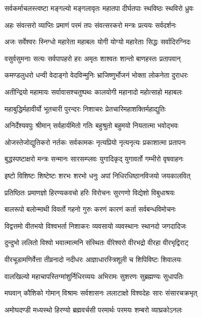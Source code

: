 \twolineshloka
{सर्वकर्माचलस्त्वष्टा मङ्गल्यो मङ्गलावृतः}
{महातपा दीर्घतपाः स्थविष्ठः स्थविरो ध्रुवः}

\twolineshloka
{अहः संवत्सरो व्याप्तिः प्रमाणं परमं तपः}
{संवत्सरकरो मन्त्रः प्रत्ययः सर्वदर्शनः}

\twolineshloka
{अजः सर्वेश्वरः स्निग्धो महारेता महाबलः}
{योगी योग्यो महारेताः सिद्धः सर्वादिरग्निदः}

\twolineshloka
{वसुर्वसुमनाः सत्यः सर्वपापहरो हरः}
{अमृतः शाश्वतः शान्तो बाणहस्तः प्रतापवान्}

\twolineshloka
{कमण्डलुधरो धन्वी वेदाङ्गो वेदविन्मुनिः}
{भ्राजिष्णुर्भोजनं भोक्ता लोकनेता दुराधरः}

\twolineshloka
{अतीन्द्रियो महामायः सर्वावासश्चतुष्पथः}
{कालयोगी महानादो महोत्साहो महाबलः}

\twolineshloka
{महाबुद्धिर्महावीर्यो भूतचारी पुरन्दरः}
{निशाचरः प्रेतचारिमहाशक्तिर्महाद्युतिः}

\twolineshloka
{अनिर्देश्यवपुः श्रीमान् सर्वहार्यमितो गतिः}
{बहुश्रुतो बहुमयो नियतात्मा भवोद्भवः}

\twolineshloka
{ओजस्तेजोद्युतिकरो नर्तकः सर्वकामकः}
{नृत्यप्रियो नृत्यनृत्यः प्रकाशात्मा प्रतापनः}

\twolineshloka
{बुद्धस्पष्टाक्षरो मन्त्रः सन्मानः सारसम्प्लवः}
{युगादिकृद् युगावर्तो गम्भीरो वृषवाहनः}

\twolineshloka
{इष्टो विशिष्टः शिष्टेष्टः शरभः शरभो धनुः}
{अपां निधिरधिष्ठानविजयो जयकालवित्}

\twolineshloka
{प्रतिष्ठितः प्रमाणज्ञो हिरण्यकवचो हरिः}
{विरोचनः सुरगणो विद्येशो विबुधाश्रयः}

\twolineshloka
{बालरूपो बलोन्माथी विवर्तो गहनो गुरुः}
{करणं कारणं कर्ता सर्वबन्धविमोचनः}

\twolineshloka
{विद्वत्तमो वीतभयो विश्वभर्ता निशाकरः}
{व्यवसायो व्यवस्थानः स्थानदो जगदादिजः}

\twolineshloka
{दुन्दुभो ललितो विश्वो भवात्मात्मनि संस्थितः}
{वीरेश्वरो वीरभद्रो वीरहा वीरभृद्विराट्}

\twolineshloka
{वीरचूडामणिर्वेत्ता तीव्रनादो नदीधरः}
{आज्ञाधारस्त्रिशूली च शिपिविष्टः शिवालयः}

\twolineshloka
{वालखिल्यो महाचापस्तिग्मांशुर्निधिरव्ययः}
{अभिरामः सुशरणः सुब्रह्मण्यः सुधापतिः}

\twolineshloka
{मघवान् कौशिको गोमान् विश्रामः सर्वशासनः}
{ललाटाक्षो विश्वदेहः सारः संसारचक्रभृत्}

\twolineshloka
{अमोघदण्डी मध्यस्थो हिरण्यो ब्रह्मवर्चसी}
{परमार्थः परमयः शम्बरो व्याघ्रकोऽनलः}

